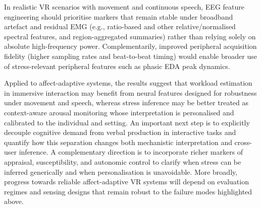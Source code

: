 \documentclass[lettersize,journal]{IEEEtran}
\begin{document}
In realistic VR scenarios with movement and continuous speech, EEG feature engineering should prioritise markers that remain stable under broadband artefact and residual EMG (e.g., ratio-based and other relative/normalised spectral features, and region-aggregated summaries) rather than relying solely on absolute high-frequency power. Complementarily, improved peripheral acquisition fidelity (higher sampling rates and beat-to-beat timing) would enable broader use of stress-relevant peripheral features such as phasic EDA peak dynamics.

Applied to affect-adaptive systems, the results suggest that workload estimation in immersive interaction may benefit from neural features designed for robustness under movement and speech, whereas stress inference may be better treated as context-aware arousal monitoring whose interpretation is personalised and calibrated to the individual and setting. An important next step is to explicitly decouple cognitive demand from verbal production in interactive tasks and quantify how this separation changes both mechanistic interpretation and cross-user inference. A complementary direction is to incorporate richer markers of appraisal, susceptibility, and autonomic control to clarify when stress can be inferred generically and when personalisation is unavoidable. More broadly, progress towards reliable affect-adaptive VR systems will depend on evaluation regimes and sensing designs that remain robust to the failure modes highlighted above.


\end{document}
